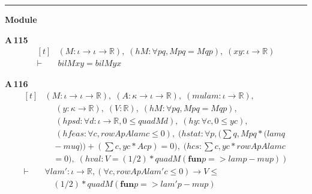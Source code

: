 \vspace{4pt}\noindent\rule{\columnwidth}{0.4pt}\par\vspace{2pt}
\noindent\textbf{Module }\par\vspace{3pt}

\noindent\textbf{A\,115}\quad{}
{\footnotesize\[ \begin{aligned}[t]
&(\mathit{M} : \iota \to \iota \to \mathbb{R} ),\; (\mathit{hM} : \forall \mathit{p} \mathit{q}, \mathit{M} \mathit{p} \mathit{q} = \mathit{M} \mathit{q} \mathit{p}),\; (\mathit{x} \mathit{y} : \iota \to \mathbb{R} )\\
\vdash\;&\mathit{bil} \mathit{M} \mathit{x} \mathit{y} = \mathit{bil} \mathit{M} \mathit{y} \mathit{x}
\end{aligned} \]}

\noindent\textbf{A\,116}\quad{}
{\footnotesize\[ \begin{aligned}[t]
&(\mathit{M} : \iota \to \iota \to \mathbb{R} ),\; (\mathit{A} : \kappa \to \iota \to \mathbb{R} ),\; (\mathit{mu} \mathit{lam} : \iota \to \mathbb{R} ),\\
&\quad \; (\mathit{y} : \kappa \to \mathbb{R} ),\; (\mathit{V} : \mathbb{R} ),\; (\mathit{hM} : \forall \mathit{p} \mathit{q}, \mathit{M} \mathit{p} \mathit{q} = \mathit{M} \mathit{q} \mathit{p}),\\
&\quad \; (\mathit{hpsd} : \forall \mathit{d} : \iota \to \mathbb{R} , 0 \leq \mathit{quad} \mathit{M} \mathit{d}),\; (\mathit{hy} : \forall \mathit{c}, 0 \leq \mathit{y} \mathit{c}),\\
&\quad \; (\mathit{hfeas} : \forall \mathit{c}, \mathit{rowAp} \mathit{A} \mathit{lam} \mathit{c} \leq 0),\; (\mathit{hstat} : \forall \mathit{p}, (\textstyle\sum \mathit{q}, \mathit{M} \mathit{p} \mathit{q} * (\mathit{lam} \mathit{q}\\
&\quad - \mathit{mu} \mathit{q})) + (\textstyle\sum \mathit{c}, \mathit{y} \mathit{c} * \mathit{A} \mathit{c} \mathit{p}) = 0),\; (\mathit{hcs} : \textstyle\sum \mathit{c}, \mathit{y} \mathit{c} * \mathit{rowAp} \mathit{A} \mathit{lam} \mathit{c}\\
&\quad = 0),\; (\mathit{hval} : \mathit{V} = (1/2) * \mathit{quad} \mathit{M} (\mathbf{fun} \mathit{p} => \mathit{lam} \mathit{p} - \mathit{mu} \mathit{p}))\\
\vdash\;&\forall \mathit{lam'} : \iota \to \mathbb{R} , (\forall \mathit{c}, \mathit{rowAp} \mathit{A} \mathit{lam'} \mathit{c} \leq 0) \to \mathit{V} \leq\\
&\quad (1/2) * \mathit{quad} \mathit{M} (\mathbf{fun} \mathit{p} => \mathit{lam'} \mathit{p} - \mathit{mu} \mathit{p})
\end{aligned} \]}

